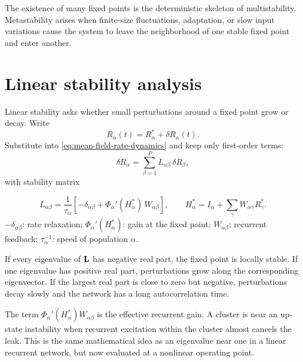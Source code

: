 The existence of many fixed points is the deterministic skeleton of multistability. Metastability arises when finite-size fluctuations, adaptation, or slow input variations cause the system to leave the neighborhood of one stable fixed point and enter another.

\section{Linear stability analysis}
\label{sec:linear-stability-analysis-mean-field}

Linear stability asks whether small perturbations around a fixed point grow or decay. Write
%
\begin{equation}
  R_\alpha(t)=R_\alpha^*+\delta R_\alpha(t).
  \label{eq:linear-perturbation}
\end{equation}
%
Substitute into \cref{eq:mean-field-rate-dynamics} and keep only first-order terms:
%
\begin{equation}
  \delta \dot R_\alpha
  =
  \sum_{\beta=1}^P
  L_{\alpha\beta}\,\delta R_\beta,
  \label{eq:linearized-population-dynamics}
\end{equation}
%
with stability matrix
%
\begin{keyequation}
\begin{equation}
  L_{\alpha\beta}
  =
  \frac{1}{\tau_\alpha}
  \left[
    -\delta_{\alpha\beta}
    +
    \Phi_\alpha'(H_\alpha^*)\,W_{\alpha\beta}
  \right],
  \qquad
  H_\alpha^*=I_\alpha+\sum_\gamma W_{\alpha\gamma}R_\gamma^* .
  \label{eq:mf-stability-matrix}
\end{equation}
\tcblower
$-\delta_{\alpha\beta}$: rate relaxation; \quad
$\Phi_\alpha'(H_\alpha^*)$: gain at the fixed point; \quad
$W_{\alpha\beta}$: recurrent feedback; \quad
$\tau_\alpha^{-1}$: speed of population $\alpha$.
\end{keyequation}

\noindent If every eigenvalue of $\mathbf{L}$ has negative real part, the fixed point is locally stable. If one eigenvalue has positive real part, perturbations grow along the corresponding eigenvector. If the largest real part is close to zero but negative, perturbations decay slowly and the network has a long autocorrelation time.

The term $\Phi_\alpha'(H_\alpha^*)W_{\alpha\beta}$ is the effective recurrent gain. A cluster is near an up-state instability when recurrent excitation within the cluster almost cancels the leak. This is the same mathematical idea as an eigenvalue near one in a linear recurrent network, but now evaluated at a nonlinear operating point.

